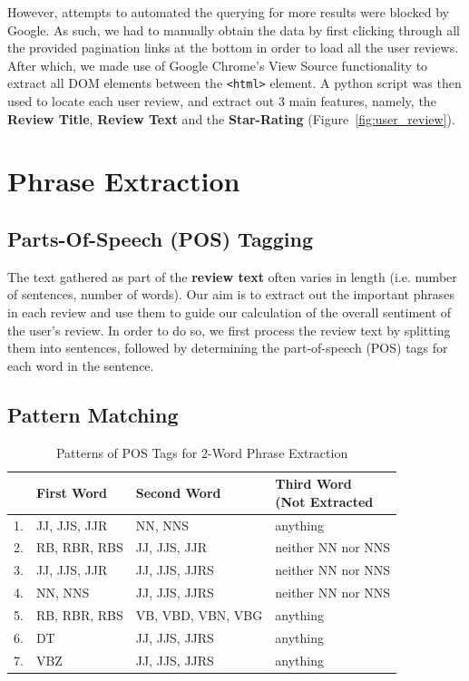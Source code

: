 \documentclass[11pt]{report} %
\begin{document}
However, attempts to automated the querying for more results were blocked by Google. As such, we had to manually obtain the data by first clicking through all the provided pagination links at the bottom in order to load all the user reviews. After which, we made use of Google Chrome's View Source functionality to extract all DOM elements between the \verb|<html>| element. A python script was then used to locate each user review, and extract out 3 main features, namely, the \textbf{Review Title}, \textbf{Review Text} and the \textbf{Star-Rating} (Figure~\ref{fig:user_review}).

\section{Phrase Extraction}
\label{subsection:phrase_extraction}
\subsection{Parts-Of-Speech (POS) Tagging}
The text gathered as part of the \textbf{review text} often varies in length (i.e. number of sentences, number of words). Our aim is to extract out the important phrases in each review and use them to guide our calculation of the overall sentiment of the user's review. In order to do so, we first process the review text by splitting them into sentences, followed by determining the part-of-speech (POS) tags for each word in the sentence. 
\subsection{Pattern Matching}
\begin{table}[h]
	\centering
    \begin{tabular}{  l  l  l  l}
    \hline\hline
    	 & First Word & Second Word & \shortstack{Third Word \\ (Not Extracted} \\ \hline
	1. & JJ, JJS, JJR & NN, NNS & anything \\ \hline
	2. & RB, RBR, RBS &JJ, JJS, JJR & neither NN nor NNS \\ \hline
	3. & JJ, JJS, JJR & JJ, JJS, JJRS & neither NN nor NNS \\ \hline
	4. & NN, NNS & JJ, JJS, JJRS & neither NN nor NNS \\ \hline
	5. & RB, RBR, RBS &VB, VBD, VBN, VBG & anything \\ \hline
	6. & DT & JJ, JJS, JJRS & anything \\ \hline
	7. & VBZ & JJ, JJS, JJRS & anything \\ \hline
    \hline
    \end{tabular}
\caption{Patterns of POS Tags for 2-Word Phrase Extraction}
\label{fig:postags}
\end{table}
\end{document}
